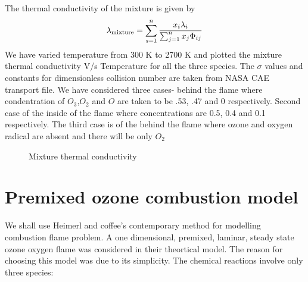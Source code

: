 \noindent The thermal conductivity of the mixture is given by 
\begin{equation}
\lambda_{\textnormal{mixture}} = \sum_{s=1}^{n} \frac {x_i \lambda_i}{\sum_{j=1}^{n} x_j \Phi_{ij}}
\end{equation}
\noindent  We have varied temperature from 300 K to 2700 K and plotted the mixture thermal conductivity V/s Temperature for all the  three species. The $\sigma$ values and constants for dimensionless collision number are taken from NASA CAE transport file. We have considered three cases-  behind the flame where condentration of $O_3$,$O_2$ and $O$ are taken to be .53, .47 and 0 respectively. Second case of the inside of the flame where concentrations are 0.5, 0.4 and 0.1 respectively. The third case is of the behind the flame where ozone and oxygen radical are absent and there will be only $O_2$


\begin{figure}[H]


    \caption{Mixture thermal conductivity}
\end{figure}
 
 
 
 \section{Premixed ozone combustion model}
We shall use Heimerl and coffee's\cite{Heimerl} contemporary method for modelling combustion flame problem. A one dimensional, premixed, laminar, steady state ozone oxygen flame was considered in their theortical model. The reason for choosing this model was due to its simplicity. The chemical reactions involve only three species:


